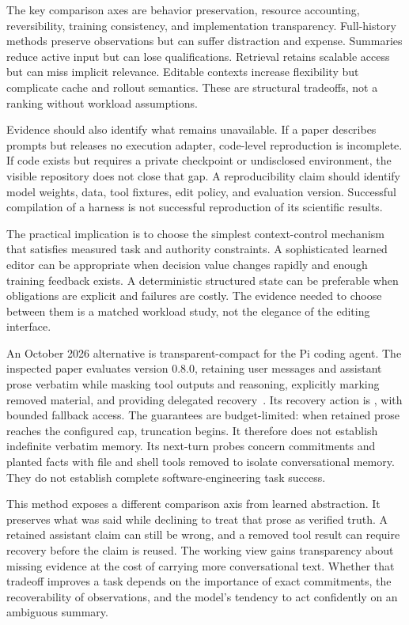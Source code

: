 The key comparison axes are behavior preservation, resource accounting, reversibility, training consistency, and implementation transparency. Full-history methods preserve observations but can suffer distraction and expense. Summaries reduce active input but can lose qualifications. Retrieval retains scalable access but can miss implicit relevance. Editable contexts increase flexibility but complicate cache and rollout semantics. These are structural tradeoffs, not a ranking without workload assumptions.

Evidence should also identify what remains unavailable. If a paper describes prompts but releases no execution adapter, code-level reproduction is incomplete. If code exists but requires a private checkpoint or undisclosed environment, the visible repository does not close that gap. A reproducibility claim should identify model weights, data, tool fixtures, edit policy, and evaluation version. Successful compilation of a harness is not successful reproduction of its scientific results.

The practical implication is to choose the simplest context-control mechanism that satisfies measured task and authority constraints. A sophisticated learned editor can be appropriate when decision value changes rapidly and enough training feedback exists. A deterministic structured state can be preferable when obligations are explicit and failures are costly. The evidence needed to choose between them is a matched workload study, not the elegance of the editing interface.

An October 2026 alternative is transparent-compact for the Pi coding agent. The inspected paper evaluates version 0.8.0, retaining user messages and assistant prose verbatim while masking tool outputs and reasoning, explicitly marking removed material, and providing delegated recovery~\cite{woolford2026transparent}. Its recovery action is , with bounded fallback access. The guarantees are budget-limited: when retained prose reaches the configured cap, truncation begins. It therefore does not establish indefinite verbatim memory. Its next-turn probes concern commitments and planted facts with file and shell tools removed to isolate conversational memory. They do not establish complete software-engineering task success.

This method exposes a different comparison axis from learned abstraction. It preserves what was said while declining to treat that prose as verified truth. A retained assistant claim can still be wrong, and a removed tool result can require recovery before the claim is reused. The working view gains transparency about missing evidence at the cost of carrying more conversational text. Whether that tradeoff improves a task depends on the importance of exact commitments, the recoverability of observations, and the model's tendency to act confidently on an ambiguous summary.


